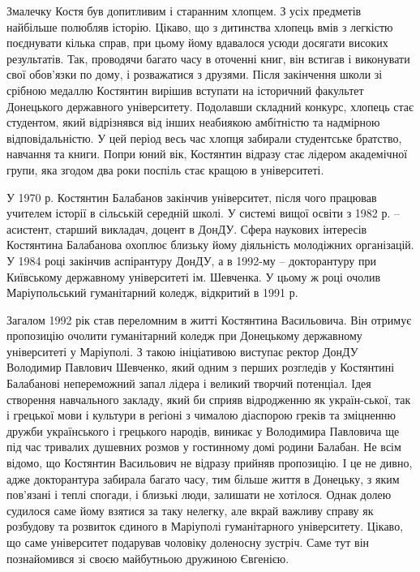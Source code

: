 
Змалечку Костя був допитливим і старанним хлопцем. З усіх предметів найбільше
полюбляв історію. Цікаво, що з дитинства хлопець вмів з легкістю поєднувати
кілька справ, при цьому йому вдавалося усюди досягати високих результатів. Так,
проводячи багато часу в оточенні книг, він встигав і виконувати свої обов'язки
по дому, і розважатися з друзями. Після закінчення школи зі срібною медаллю
Костянтин вирішив вступати на історичний факультет Донецького державного
університету. Подолавши складний конкурс, хлопець стає студентом, який
відрізнявся від інших неабиякою амбітністю та надмірною відповідальністю. У цей
період весь час хлопця забирали студентське братство, навчання та книги. Попри
юний вік, Костянтин відразу стає лідером академічної групи, яка згодом два роки
поспіль стає кращою в університеті.


У 1970 р. Костянтин Балабанов закінчив університет, після чого працював
учителем історії в сільській середній школі. У системі вищої освіти з 1982 р. –
асистент, старший викладач, доцент в ДонДУ. Сфера наукових інтересів Костянтина
Балабанова охоплює близьку йому діяльність молодіжних організацій. У 1984 році
закінчив аспірантуру ДонДУ, а в 1992-му – докторантуру при Київському
державному університеті ім. Шевченка. У цьому ж році очолив Маріупольський
гуманітарний коледж, відкритий в 1991 р.


Загалом 1992 рік став переломним в житті Костянтина Васильовича. Він отримує
пропозицію очолити гуманітарний коледж при Донецькому державному університеті у
Маріуполі. З такою ініціативою виступає ректор ДонДУ Володимир Павлович
Шевченко, який одним з перших розгледів у Костянтині Балабанові непереможний
запал лідера і великий творчий потенціал. Ідея створення навчального закладу,
який би сприяв відродженню як україн\hyp{}ської, так і грецької мови і культури в
регіоні з чималою діаспорою греків та зміцненню дружби українського і грецького
народів, виникає у Володимира Павловича ще під час тривалих душевних розмов у
гостинному домі родини Балабан. Не всім відомо, що Костянтин Васильович не
відразу прийняв пропозицію. І це не дивно, адже докторантура забирала багато
часу, тим більше життя в Донецьку, з яким пов'язані і теплі спогади, і близькі
люди, залишати не хотілося. Однак долею судилося саме йому взятися за таку
нелегку, але вкрай важливу справу як розбудову та розвиток єдиного в Маріуполі
гуманітарного університету. Цікаво, що саме університет подарував чоловіку
доленосну зустріч. Саме тут він познайомився зі своєю майбутньою дружиною
Євгенією.

